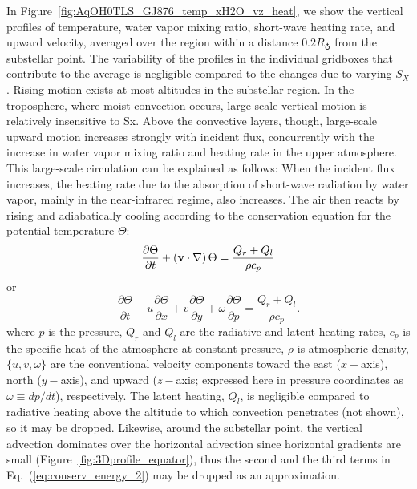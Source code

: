 \documentclass[11pt,numberedappendix,twocolappendix,]{emulateapj}
\def\wv{water vapor}
\begin{document}
In Figure~\ref{fig:AqOH0TLS_GJ876_temp_xH2O_vz_heat}, we show the vertical profiles of temperature, \wv{} mixing ratio, short-wave heating rate, and upward velocity, averaged over the region within a distance $0.2R_\earth$ from the substellar point. 
The variability of the profiles in the individual gridboxes that contribute to the average
is negligible compared to the changes due to varying $S_X$. 
%
Rising motion exists at most altitudes in the substellar region.  In the troposphere, where moist convection occurs, large-scale vertical motion is relatively insensitive to Sx.  Above the convective layers, though, large-scale upward motion increases strongly with incident flux,
%
concurrently with the increase in \wv{} mixing ratio and heating rate in the upper atmosphere. 
This large-scale circulation can be explained as follows: When the incident flux increases, the heating rate due to the absorption of short-wave radiation by \wv{}, mainly in the near-infrared regime, also increases. 
The air then reacts by rising and adiabatically cooling according to the conservation equation for the potential temperature $\Theta $:
\begin{equation}
\frac{\partial \Theta }{\partial t} + ( {\bf v} \cdot \nabla ) \, \Theta = \frac{ Q_r + Q_l }{\rho c_p} \label{eq:conserv_energy}
\end{equation}
or
\begin{equation}
\frac{\partial \Theta }{\partial t} + u \frac{\partial \Theta }{\partial x} + v\frac{\partial \Theta }{\partial y} + \omega \frac{\partial \Theta }{\partial p} = \frac{ Q_r + Q_l }{\rho c_p}. \label{eq:conserv_energy_2}
\end{equation}
where $p$ is the pressure, $Q_r$ and $Q_l$ are the radiative and latent heating rates, $c_p$ is the specific heat of the atmosphere at constant pressure, $\rho $ is atmospheric density, $\{ u, v, \omega \}$ are the conventional velocity components toward the east ($x-$axis), north ($y-$axis), and upward ($z-$axis; expressed here in pressure coordinates as $\omega \equiv dp/dt$), respectively. 
The latent heating, $Q_l$, is negligible compared to radiative heating above the altitude to which convection penetrates (not shown), so it may be dropped. 
Likewise, around the substellar point, the vertical advection dominates over the horizontal advection since horizontal gradients are small (Figure~\ref{fig:3Dprofile_equator}), thus the second and the third terms in Eq.~(\ref{eq:conserv_energy_2}) may be dropped as an approximation. 
\end{document}
